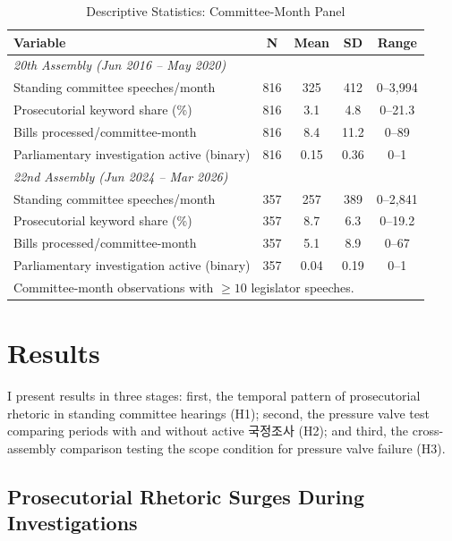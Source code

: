 \documentclass[11pt]{article}
\begin{document}
\begin{table}[htbp]
\centering
\caption{Descriptive Statistics: Committee-Month Panel}
\label{tab:desc}
\begin{tabular}{lcccc}
\toprule
Variable & N & Mean & SD & Range \\
\midrule
\multicolumn{5}{l}{\textit{20th Assembly (Jun 2016 -- May 2020)}} \\
Standing committee speeches/month & 816 & 325 & 412 & 0--3,994 \\
Prosecutorial keyword share (\%) & 816 & 3.1 & 4.8 & 0--21.3 \\
Bills processed/committee-month & 816 & 8.4 & 11.2 & 0--89 \\
Parliamentary investigation active (binary) & 816 & 0.15 & 0.36 & 0--1 \\
\midrule
\multicolumn{5}{l}{\textit{22nd Assembly (Jun 2024 -- Mar 2026)}} \\
Standing committee speeches/month & 357 & 257 & 389 & 0--2,841 \\
Prosecutorial keyword share (\%) & 357 & 8.7 & 6.3 & 0--19.2 \\
Bills processed/committee-month & 357 & 5.1 & 8.9 & 0--67 \\
Parliamentary investigation active (binary) & 357 & 0.04 & 0.19 & 0--1 \\
\bottomrule
\multicolumn{5}{l}{\footnotesize Committee-month observations with $\geq 10$ legislator speeches.} \\
\end{tabular}
\end{table}


\section{Results}
\label{sec:results}

I present results in three stages: first, the temporal pattern of prosecutorial rhetoric in standing committee hearings (H1); second, the pressure valve test comparing periods with and without active 국정조사 (H2); and third, the cross-assembly comparison testing the scope condition for pressure valve failure (H3).

\subsection{Prosecutorial Rhetoric Surges During Investigations}
\end{document}
